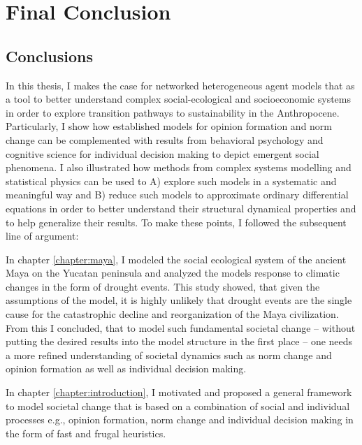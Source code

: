 \chapter{Final Conclusion}

\section{Conclusions}

In this thesis, I makes the case for networked heterogeneous agent models that as a tool to better understand complex social-ecological and socioeconomic systems in order to explore transition pathways to sustainability in the Anthropocene. 
Particularly, I show how established models for opinion formation and norm change can be complemented with results from behavioral psychology and cognitive science for individual decision making to depict emergent social phenomena.
I also illustrated how methods from complex systems modelling and statistical physics can be used to A) explore such models in a systematic and meaningful way and B) reduce such models to approximate ordinary differential equations in order to better understand their structural dynamical properties and to help generalize their results.
To make these points, I followed the subsequent line of argument:

In chapter \ref{chapter:maya}, I modeled the social ecological system of the ancient Maya on the Yucatan peninsula and analyzed the models response to climatic changes in the form of drought events.
This study showed, that given the assumptions of the model, it is highly unlikely that drought events are the single cause for the catastrophic decline and reorganization of the Maya civilization.
From this I concluded, that to model such fundamental societal change -- without putting the desired results into the model structure in the first place -- one needs a more refined understanding of societal dynamics such as norm change and opinion formation as well as individual decision making.

In chapter \ref{chapter:introduction}, I motivated and proposed a general framework to model societal change that is based on a combination of social and individual processes e.g., opinion formation, norm change and individual decision making in the form of fast and frugal heuristics.

